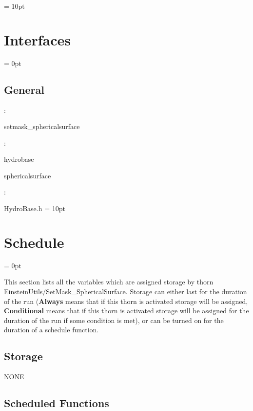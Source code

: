 \vspace{0.5cm}\parskip = 10pt 

\section{Interfaces} 


\parskip = 0pt

\vspace{3mm} \subsection*{General}

: 

setmask\_sphericalsurface
\vspace{2mm}

: 

hydrobase

sphericalsurface
\vspace{2mm}

\vspace{5mm}

: 

HydroBase.h
\vspace{2mm}\parskip = 10pt 

\section{Schedule} 


\parskip = 0pt


\noindent This section lists all the variables which are assigned storage by thorn EinsteinUtils/SetMask\_SphericalSurface.  Storage can either last for the duration of the run ({\bf Always} means that if this thorn is activated storage will be assigned, {\bf Conditional} means that if this thorn is activated storage will be assigned for the duration of the run if some condition is met), or can be turned on for the duration of a schedule function.


\subsection*{Storage}NONE
\subsection*{Scheduled Functions}
\vspace{5mm}


